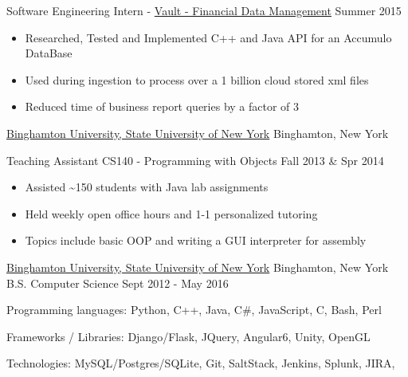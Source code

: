 \documentclass[11pt]{article}
\begin{document}
{{    }
    \headedsubsection
    {Software Engineering Intern - \href{https://www.bloomberg.com/professional/product/vault/}{Vault - Financial Data Management}}
    {Summer 2015}
    {
        \begin{itemize}
            \item Researched, Tested and Implemented C++ and Java API for an Accumulo DataBase
            \item Used during ingestion to process over a 1 billion cloud stored xml files
            \item Reduced time of business report queries by a factor of 3
        \end{itemize}
    }
}

\headedsection  %
{\href{http://www.binghamton.edu/index.php}{Binghamton University, State University of New York}}
{Binghamton, New York}
{
    \headedsubsection
    {Teaching Assistant CS140 - Programming with Objects}
    {Fall 2013 \& Spr 2014}
    {
        \begin{itemize}
            \item Assisted \textasciitilde 150 students with Java lab assignments 
            \item Held weekly open office hours and 1-1 personalized tutoring
            \item Topics include basic OOP and writing a GUI interpreter for assembly
        \end{itemize}
    }
}

\spacedhrule{0.2em}{0.2em}  %

\headedsection
{\href{http://www.binghamton.edu/index.php}{Binghamton University, State University of New York}}
{Binghamton, New York} {
    \headedsubsection
    {B.S. Computer Science}
    {Sept 2012 - May 2016}
    {}
}
\spacedhrule{0.2em}{0.2em}  %

\inlineskillsection  %
{Programming languages:}
{ Python, C++, Java, C\#, JavaScript, C, Bash, Perl }

\inlineskillsection  
{Frameworks / Libraries:}
{ Django/Flask, JQuery, Angular6, Unity, OpenGL}

\inlineskillsection
{Technologies:}
{ MySQL/Postgres/SQLite, Git, SaltStack, Jenkins, Splunk, JIRA, \latex }
\end{document}
